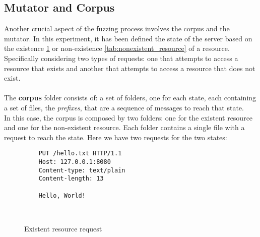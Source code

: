\subsection{Mutator and Corpus}

Another crucial aspect of the fuzzing process involves the corpus and the mutator. In this experiment, it has been defined the state of the server based on the existence \ref{tab:existent_resource} or non-existence \ref{tab:nonexistent_resource} of a resource. Specifically considering two types of requests: one that attempts to access a resource that exists and another that attempts to access a resource that does not exist.
\\\\The \textbf{corpus} folder consists of: a set of folders, one for each state, each containing a set of files, the \textit{prefixes}, that are a sequence of messages to reach that state.
\\In this case, the corpus is composed by two folders: one for the existent resource and one for the non-existent resource. Each folder contains a single file with a request to reach the state.
Here we have two requests for the two states:
\begin{figure}[H]
    \centering
    \begin{adjustbox}{valign=t}
    \begin{lstlisting}
    PUT /hello.txt HTTP/1.1
    Host: 127.0.0.1:8080
    Content-type: text/plain
    Content-length: 13

    Hello, World!

    
    \end{lstlisting}
    \end{adjustbox}
    \caption{Existent resource request}
    \label{tab:existent_resource}
\end{figure}
    
